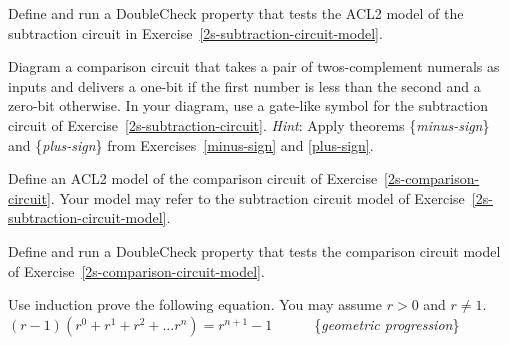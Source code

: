 \begin{ExerciseList}
\Exercise Define and run a DoubleCheck property that
tests the ACL2 model of the subtraction circuit
in Exercise~\ref{2s-subtraction-circuit-model}.

\Exercise \label{2s-comparison-circuit}
Diagram a comparison circuit that takes a pair of
twos-complement numerals as inputs and delivers a one-bit
if the first number is less than the second
and a zero-bit otherwise.
In your diagram, use a gate-like symbol
for the subtraction circuit of Exercise~\ref{2s-subtraction-circuit}.
\emph{Hint}: Apply theorems \{\emph{minus-sign}\} and \{\emph{plus-sign}\}
from Exercises~\ref{minus-sign} and \ref{plus-sign}.

\Exercise \label{2s-comparison-circuit-model}
Define an ACL2 model of the comparison circuit
of Exercise~\ref{2s-comparison-circuit}.
Your model may refer to the subtraction circuit model
of Exercise~\ref{2s-subtraction-circuit-model}.

\Exercise Define and run a DoubleCheck property
that tests the comparison circuit model
of Exercise~\ref{2s-comparison-circuit-model}.

\Exercise \label{ex:geometric-progression}
Use induction prove the following equation. You may assume $r > 0$ and $r \neq 1$.\\
\hspace*{18mm}$(r - 1)(r^0 + r^1 + r^2 + \dots r^n) = r^{n+1} - 1$~~~~~~\{\emph{geometric progression}\}


\end{ExerciseList}

